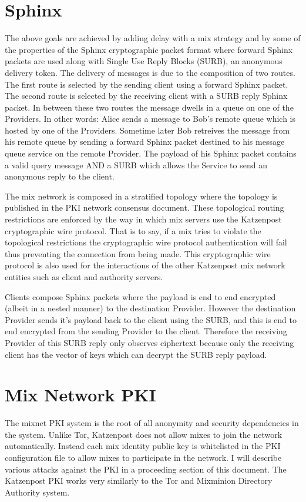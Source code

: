 \documentclass[conference]{IEEEtran}
\begin{document}
\section{Sphinx}
The above goals are achieved by adding delay with a mix strategy and
by some of the properties of the Sphinx cryptographic packet format
\cite{DanezisG09} \cite{SphinxSpec} where forward Sphinx packets are
used along with Single Use Reply Blocks (SURB), an anonymous delivery
token.  The delivery of messages is due to the composition of two
routes. The first route is selected by the sending client using a
forward Sphinx packet. The second route is selected by the receiving
client with a SURB reply Sphinx packet. In between these two routes
the message dwells in a queue on one of the Providers. In other words:
Alice sends a message to Bob's remote queue which is hosted by one of
the Providers. Sometime later Bob retreives the message from his
remote queue by sending a forward Sphinx packet destined to his
message queue service on the remote Provider. The payload of his
Sphinx packet contains a valid query message AND a SURB which allows
the Service to send an anonymous reply to the client.

The mix network is composed in a stratified topology
\cite{topology-pet2010} where the topology is published in the PKI
network consensus document. These topological routing restrictions are
enforced by the way in which mix servers use the Katzenpost cryptographic wire
protocol. \cite{KatzMixWire} That is to say, if a mix tries to violate
the topological restrictions the cryptographic wire protocol authentication 
will fail thus preventing the connection from being made. This cryptographic 
wire protocol is also used for the interactions of the other Katzenpost mix
network entities such as client and authority servers.

Clients compose Sphinx packets where the payload is end to
end encrypted (albeit in a nested manner) to the destination
Provider. However the destination Provider sends it's payload back to
the client using the SURB, and this is end to end encrypted from the
sending Provider to the client. Therefore the receiving Provider of
this SURB reply only observes ciphertext because only the receiving
client has the vector of keys which can decrypt the SURB reply
payload.

\section{Mix Network PKI}
The mixnet PKI system \cite{KatzMixPKI} is the root of all
anonymity and security dependencies in the system. Unlike Tor,
Katzenpost does not allow mixes to join the network
automatically. Instead each mix identity public key is whitelisted in
the PKI configuration file to allow mixes to participate in the
network. I will describe various attacks against the PKI in a
proceeding section of this document. The Katzenpost PKI works very
similarly to the Tor and Mixminion Directory Authority system.
\end{document}
